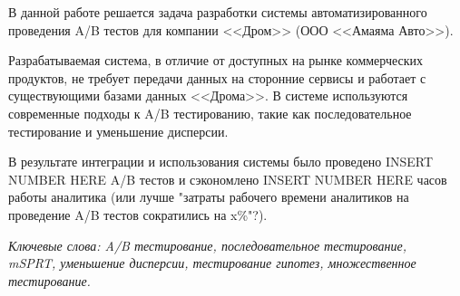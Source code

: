 \documentclass[../document.tex]{subfiles}
\begin{document}
	\par В данной работе решается задача разработки системы автоматизированного проведения A/B тестов для компании <<Дром>> (ООО <<Амаяма Авто>>).
	\par Разрабатываемая система, в отличие от доступных на рынке коммерческих продуктов, не требует передачи данных на сторонние сервисы и работает с существующими базами данных <<Дрома>>. В системе используются современные подходы к A/B тестированию, такие как последовательное тестирование и уменьшение дисперсии.
	\par В результате интеграции и использования системы было проведено INSERT NUMBER HERE A/B тестов и сэкономлено INSERT NUMBER HERE часов работы аналитика (или лучше "затраты рабочего времени аналитиков на проведение A/B тестов сократились на x\%"?).
	\par \textit{Ключевые слова: A/B тестирование, последовательное тестирование,\\ 
		mSPRT, уменьшение дисперсии, тестирование гипотез, множественное тестирование.}
\end{document}
